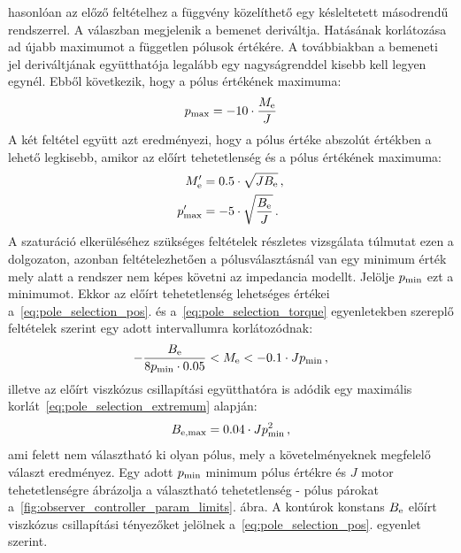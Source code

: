 hasonlóan az előző feltételhez a függvény közelíthető egy késleltetett másodrendű rendszerrel. A válaszban 
megjelenik a bemenet deriváltja. Hatásának korlátozása ad újabb maximumot a független pólusok értékére. A 
továbbiakban a bemeneti jel deriváltjának együtthatója legalább egy nagyságrenddel kisebb kell legyen egynél.
Ebből következik, hogy a pólus értékének maximuma:
\begin{align}\label{eq:pole_selection_torque}
    p_{\mathrm{max}} = -10 \cdot \frac{M_{\mathrm{e}}}{J}
\end{align}
A két feltétel együtt azt eredményezi, hogy a pólus értéke abszolút értékben a lehető legkisebb, amikor
az előírt tehetetlenség és a pólus értékének maximuma:
\begin{equation}\label{eq:pole_selection_extremum}
    \begin{split}
        M'_{\mathrm{e}} &= 0.5 \cdot \sqrt{JB_{\mathrm{e}}}\,, \\
        p'_{\mathrm{max}} &= -5 \cdot \sqrt{\frac{B_{\mathrm{e}}}{J}}\,.
    \end{split}
\end{equation}
A szaturáció elkerüléséhez szükséges feltételek részletes vizsgálata túlmutat ezen a dolgozaton, azonban feltételezhetően 
a pólusválasztásnál van egy minimum érték mely alatt a rendszer nem képes követni az impedancia modellt. Jelölje \(p_{\mathrm{min}}\) ezt a 
minimumot. Ekkor az előírt tehetetlenség lehetséges értékei a~\eqref{eq:pole_selection_pos}. és a~\eqref{eq:pole_selection_torque} 
egyenletekben szereplő feltételek szerint egy adott intervallumra korlátozódnak:
\begin{align}
    -\frac{B_{\mathrm{e}}}{8p_{\mathrm{min}} \cdot 0.05} < M_{\mathrm{e}} < -0.1 \cdot Jp_{\mathrm{min}}\,,
\end{align}
illetve az előírt viszkózus csillapítási együtthatóra is adódik egy maximális korlát~\eqref{eq:pole_selection_extremum} alapján:
\begin{align}
    B_{\mathrm{e,max}} = 0.04 \cdot Jp^2_{\mathrm{min}}\,,
\end{align}
ami felett nem választható ki olyan pólus, mely a követelményeknek megfelelő választ eredményez. 
Egy adott \(p_{\mathrm{min}}\) minimum pólus értékre és \(J\) motor tehetetlenségre ábrázolja 
a választható tehetetlenség - pólus párokat a~\ref{fig:observer_controller_param_limits}. ábra.
A kontúrok konstans \(B_{\mathrm{e}}\) előírt viszkózus csillapítási tényezőket jelölnek a~\eqref{eq:pole_selection_pos}.
egyenlet szerint.

